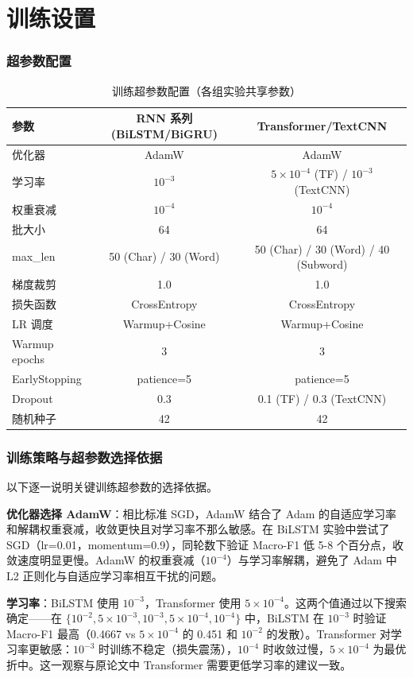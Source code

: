 \chapter{训练设置}

\subsection{超参数配置}

\begin{table}[htbp]
\centering
\caption{训练超参数配置（各组实验共享参数）}
\begin{tabular}{lcc}
\hline
参数 & RNN 系列 (BiLSTM/BiGRU) & Transformer/TextCNN \\
\hline
优化器 & AdamW & AdamW \\
学习率 & $10^{-3}$ & $5\times10^{-4}$ (TF) / $10^{-3}$ (TextCNN) \\
权重衰减 & $10^{-4}$ & $10^{-4}$ \\
批大小 & 64 & 64 \\
max\_len & 50 (Char) / 30 (Word) & 50 (Char) / 30 (Word) / 40 (Subword) \\
梯度裁剪 & 1.0 & 1.0 \\
损失函数 & CrossEntropy & CrossEntropy \\
LR 调度 & Warmup+Cosine & Warmup+Cosine \\
Warmup epochs & 3 & 3 \\
EarlyStopping & patience=5 & patience=5 \\
Dropout & 0.3 & 0.1 (TF) / 0.3 (TextCNN) \\
随机种子 & 42 & 42 \\
\hline
\end{tabular}
\end{table}

\subsection{训练策略与超参数选择依据}

以下逐一说明关键训练超参数的选择依据。

\textbf{优化器选择 AdamW}：相比标准 SGD，AdamW 结合了 Adam 的自适应学习率和解耦权重衰减，收敛更快且对学习率不那么敏感。在 BiLSTM 实验中尝试了 SGD（lr=0.01，momentum=0.9），同轮数下验证 Macro-F1 低 5-8 个百分点，收敛速度明显更慢。AdamW 的权重衰减（$10^{-4}$）与学习率解耦，避免了 Adam 中 L2 正则化与自适应学习率相互干扰的问题。

\textbf{学习率}：BiLSTM 使用 $10^{-3}$，Transformer 使用 $5\times10^{-4}$。这两个值通过以下搜索确定——在 $\{10^{-2}, 5\times10^{-3}, 10^{-3}, 5\times10^{-4}, 10^{-4}\}$ 中，BiLSTM 在 $10^{-3}$ 时验证 Macro-F1 最高（0.4667 vs $5\times10^{-4}$ 的 0.451 和 $10^{-2}$ 的发散）。Transformer 对学习率更敏感：$10^{-3}$ 时训练不稳定（损失震荡），$10^{-4}$ 时收敛过慢，$5\times10^{-4}$ 为最优折中。这一观察与原论文\cite{vaswani2017}中 Transformer 需要更低学习率的建议一致。

